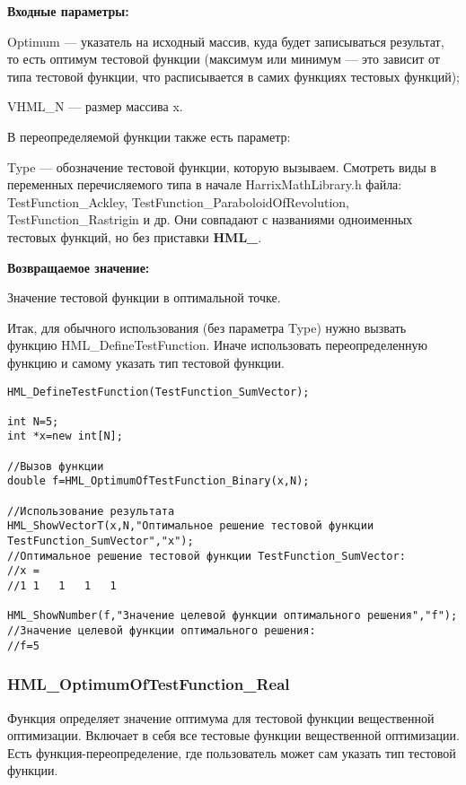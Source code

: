 \documentclass[a4paper,12pt]{article}
\begin{document}
\textbf{Входные параметры:}

Optimum --- указатель на исходный массив, куда будет записываться результат, то есть оптимум тестовой функции (максимум или минимум --- это зависит от типа тестовой функции, что расписывается в самих функциях тестовых функций);

     VHML\_N --- размер массива x.

В переопределяемой функции также есть параметр:
  
Type --- обозначение тестовой функции, которую вызываем.
Смотреть виды в переменных перечисляемого типа в начале HarrixMathLibrary.h файла: TestFunction\_Ackley, TestFunction\_ParaboloidOfRevolution, TestFunction\_Rastrigin и др. Они совпадают с названиями одноименных тестовых функций, но без приставки \textbf{HML\_}.

\textbf{Возвращаемое значение:}
 
Значение тестовой функции в оптимальной точке.

Итак, для обычного использования (без параметра Type) нужно вызвать функцию HML\_DefineTestFunction. Иначе использовать переопределенную функцию и самому указать тип тестовой функции.


\begin{lstlisting}[label=code_use_HML_OptimumOfTestFunction_Binary,caption=Пример использования]
HML_DefineTestFunction(TestFunction_SumVector);

int N=5;
int *x=new int[N];

//Вызов функции
double f=HML_OptimumOfTestFunction_Binary(x,N);

//Использование результата
HML_ShowVectorT(x,N,"Оптимальное решение тестовой функции TestFunction_SumVector","x");
//Оптимальное решение тестовой функции TestFunction_SumVector:
//x =	
//1	1	1	1	1

HML_ShowNumber(f,"Значение целевой функции оптимального решения","f");
//Значение целевой функции оптимального решения:
//f=5
\end{lstlisting}

\subsubsection{HML\_OptimumOfTestFunction\_Real}\label{HML_OptimumOfTestFunction_Real}

Функция определяет значение оптимума для тестовой функции вещественной оптимизации. Включает в себя все тестовые функции вещественной оптимизации. Есть функция-переопределение, где пользователь может сам указать тип тестовой функции.
\end{document}
